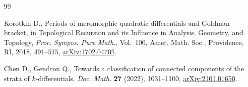 \documentclass[10pt,a4paper]{article}
\numberwithin{equation}{section}
\theoremstyle{definition}
\begin{document}
\begin{thebibliography}{99}

Korotkin D., Periods of meromorphic quadratic differentials and {G}oldman
 bracket, in Topological Recursion and its Influence in Analysis, Geometry,
 and Topology, \textit{Proc. Sympos. Pure Math.}, Vol.~100, Amer. Math. Soc.,
 Providence, RI, 2018, 491--515, \href{https://arxiv.org/abs/1702.04705}{arXiv:1702.04705}.

Chen D., Gendron Q., Towards a classification of connected components of the
 strata of {$k$}-differentials, \textit{Doc. Math.} \textbf{27} (2022),
 1031--1100, \href{https://arxiv.org/abs/2101.01650}{arXiv:2101.01650}.


\end{thebibliography}
\end{document}
